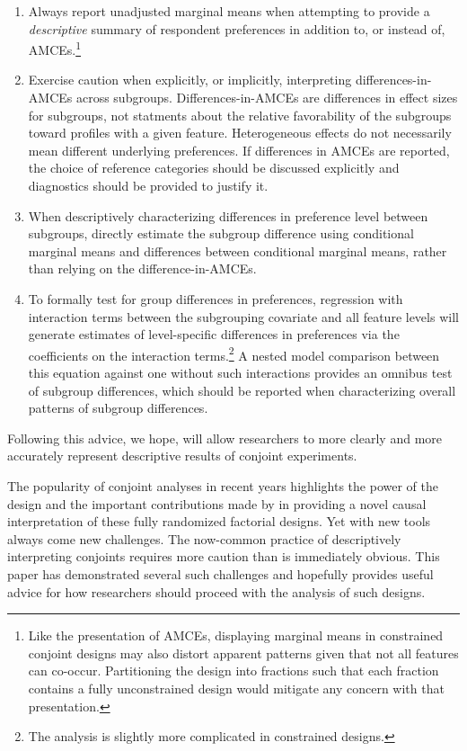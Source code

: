 \documentclass[a4paper,12pt]{article}\usepackage[]{graphicx}\usepackage[]{color}
\begin{document}
\begin{enumerate}
\item Always report unadjusted marginal means when attempting to provide a \textit{descriptive} summary of respondent preferences in addition to, or instead of, AMCEs.\footnote{Like the presentation of AMCEs, displaying marginal means in constrained conjoint designs may also distort apparent patterns given that not all features can co-occur. Partitioning the design into fractions such that each fraction contains a fully unconstrained design would mitigate any concern with that presentation.}

\item Exercise caution when explicitly, or implicitly, interpreting differences-in-AMCEs across subgroups. Differences-in-AMCEs are differences in effect sizes for subgroups, not statments about the relative favorability of the subgroups toward profiles with a given feature. Heterogeneous effects do not necessarily mean different underlying preferences. If differences in AMCEs are reported, the choice of reference categories should be discussed explicitly and diagnostics should be provided to justify it.

\item When descriptively characterizing differences in preference level between subgroups, directly estimate the subgroup difference using conditional marginal means and differences between conditional marginal means, rather than relying on the difference-in-AMCEs.

\item To formally test for group differences in preferences, regression with interaction terms between the subgrouping covariate and all feature levels will generate estimates of level-specific differences in preferences via the coefficients on the interaction terms.\footnote{The analysis is slightly more complicated in constrained designs.} A nested model comparison between this equation against one without such interactions provides an omnibus test of subgroup differences, which should be reported when characterizing overall patterns of subgroup differences.
\end{enumerate}

\noindent Following this advice, we hope, will allow researchers to more clearly and more accurately represent descriptive results of conjoint experiments.

The popularity of conjoint analyses in recent years highlights the power of the design and the important contributions made by \citet{HainmuellerHopkinsYamamoto2014} in providing a novel causal interpretation of these fully randomized factorial designs. Yet with new tools always come new challenges. The now-common practice of descriptively interpreting conjoints requires more caution than is immediately obvious. This paper has demonstrated several such challenges and hopefully provides useful advice for how researchers should proceed with the analysis of such designs.
\end{document}
